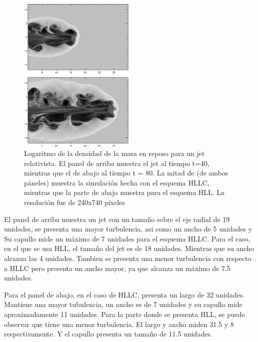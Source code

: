 \documentclass[12pt,a4paper]{book}
\begin{document}
\begin{figure}
  \begin{center}
    \includegraphics[width=0.5\textwidth]{Figuras/Introduccion/jet_mignone.png}
  \end{center}
  \caption{Logaritmo de la densidad de la masa en reposo para un jet relativista. El panel de arriba muestra el jet al tiempo t=40, mientras que el de abajo al tiempo t = 80.
  La mitad de  (de ambos páneles) muestra la simulación hecha con el esquema HLLC, mientras que la parte de abajo muestra para el esquema HLL.
  La resolución fue de 240x740 pixeles}
  \label{fig:jet_mignone}
\end{figure}

{\color{blue}El panel de arriba muestra un jet con un tamaño sobre el eje radial de 19 unidades, se presenta una mayor turbulencia, asi como un ancho de 5 unidades y Su capullo
mide un máximo de 7 unidades para el esquema HLLC.
Para el caso, en el que se usa HLL, el tamaño del jet es de 18 unidades. Mientras que su ancho alcanza las 4 unidades. Tambien se presenta una menor turbulencia con respecto a HLLC pero presenta un 
ancho mayor, ya que alcanza un máximo de 7.5 unidades.}


{\color{blue} Para el panel de abajo, en el caso de HLLC, presenta un largo de 32 unidades. Mantiene una mayor tubulencia, un ancho es de 7 unidades y su capullo mide aproximadamente 11 unidades. Para la parte donde 
se presenta HLL, se puede observar que tiene una menor turbulencia. El largo y ancho miden 31.5 y 8 respectivamente. Y el capullo presenta un tamaño de 11.5 unidades. }
\end{document}
